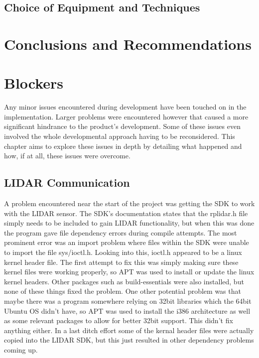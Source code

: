 		\section{Choice of Equipment and Techniques}
	
	
	\chapter{Conclusions and Recommendations}
	
	
	
	
	
	
	
	\chapter{Blockers}
	Any minor issues encountered during development have been touched on in the implementation. Larger problems were encountered however that caused a more significant hindrance to the product's development. Some of these issues even involved the whole developmental approach having to be reconsidered. This chapter aims to explore these issues in depth by detailing what happened and how, if at all, these issues were overcome.
	
	\section{LIDAR Communication}
	A problem encountered near the start of the project was getting the SDK to work with the LIDAR sensor. The SDK's documentation states that the rplidar.h file simply needs to be included to gain LIDAR functionality, but when this was done the program gave file dependency errors during compile attempts. The most prominent error was an import problem where files within the SDK were unable to import the file sys/ioctl.h. Looking into this, ioctl.h appeared to be a linux kernel header file. The first attempt to fix this was simply making sure these kernel files were working properly, so APT was used to install or update the linux kernel headers. Other packages such as build-essentials were also installed, but none of these things fixed the problem. One other potential problem was that maybe there was a program somewhere relying on 32bit libraries which the 64bit Ubuntu OS didn't have, so APT was used to install the i386 architecture as well as some relevant packages to allow for better 32bit support. This didn't fix anything either. In a last ditch effort some of the kernal header files were actually copied into the LIDAR SDK, but this just resulted in other dependency problems coming up.
	
